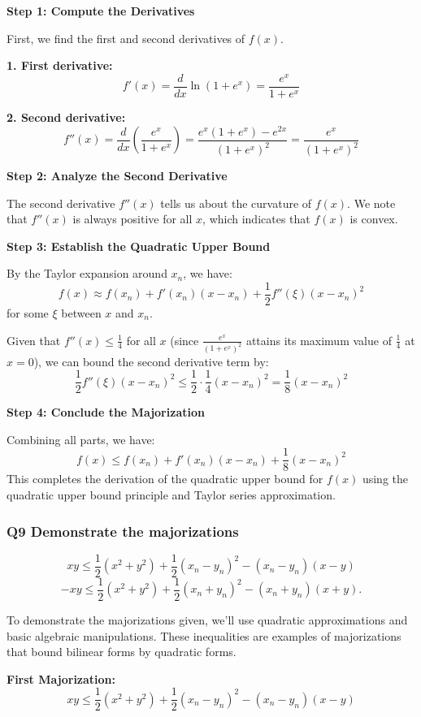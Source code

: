 \documentclass[8pt]{article}
\begin{document}
{\textbf{Step 1: Compute the Derivatives}

First, we find the first and second derivatives of \( f(x) \).

\textbf{1. First derivative:}
   \[
   f'(x) = \frac{d}{dx} \ln(1 + e^x) = \frac{e^x}{1 + e^x}
   \]

\textbf{2. Second derivative:}
   \[
   f''(x) = \frac{d}{dx} \left( \frac{e^x}{1 + e^x} \right) = \frac{e^x(1 + e^x) - e^{2x}}{(1 + e^x)^2} = \frac{e^x}{(1 + e^x)^2}
   \]

\textbf{Step 2: Analyze the Second Derivative}

The second derivative \( f''(x) \) tells us about the curvature of \( f(x) \). We note that \( f''(x) \) is always positive for all \( x \), which indicates that \( f(x) \) is convex.

\textbf{Step 3: Establish the Quadratic Upper Bound}

By the Taylor expansion around \( x_n \), we have:
\[
f(x) \approx f(x_n) + f'(x_n)(x - x_n) + \frac{1}{2}f''(\xi)(x - x_n)^2
\]
for some \( \xi \) between \( x \) and \( x_n \).

Given that \( f''(x) \leq \frac{1}{4} \) for all \( x \) (since \( \frac{e^x}{(1 + e^x)^2} \) attains its maximum value of \( \frac{1}{4} \) at \( x = 0 \)), we can bound the second derivative term by:
\[
\frac{1}{2}f''(\xi)(x - x_n)^2 \leq \frac{1}{2} \cdot \frac{1}{4} (x - x_n)^2 = \frac{1}{8} (x - x_n)^2
\]

\textbf{Step 4: Conclude the Majorization}

Combining all parts, we have:
\[
f(x) \leq f(x_n) + f'(x_n)(x - x_n) + \frac{1}{8} (x - x_n)^2
\]
This completes the derivation of the quadratic upper bound for \( f(x) \) using the quadratic upper bound principle and Taylor series approximation.

\subsubsection*{Q9 Demonstrate the majorizations}
\[
xy \leq \frac{1}{2} (x^2 + y^2) + \frac{1}{2} (x_n - y_n)^2 - (x_n - y_n)(x - y)
\]
\[
-xy \leq \frac{1}{2} (x^2 + y^2) + \frac{1}{2} (x_n + y_n)^2 - (x_n + y_n)(x + y).
\]

To demonstrate the majorizations given, we'll use quadratic approximations and basic algebraic manipulations. These inequalities are examples of majorizations that bound bilinear forms by quadratic forms.

\textbf{First Majorization:}
\[
xy \leq \frac{1}{2} (x^2 + y^2) + \frac{1}{2} (x_n - y_n)^2 - (x_n - y_n)(x - y)
\]

}
\end{document}
